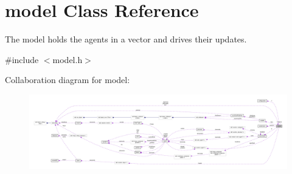 \hypertarget{classmodel}{}\section{model Class Reference}
\label{classmodel}


The model holds the agents in a vector and drives their updates.  




{\ttfamily \#include $<$model.\+h$>$}



Collaboration diagram for model\+:\nopagebreak
\begin{figure}[H]
\begin{center}
\leavevmode
\includegraphics[width=350pt]{classmodel__coll__graph}
\end{center}
\end{figure}

